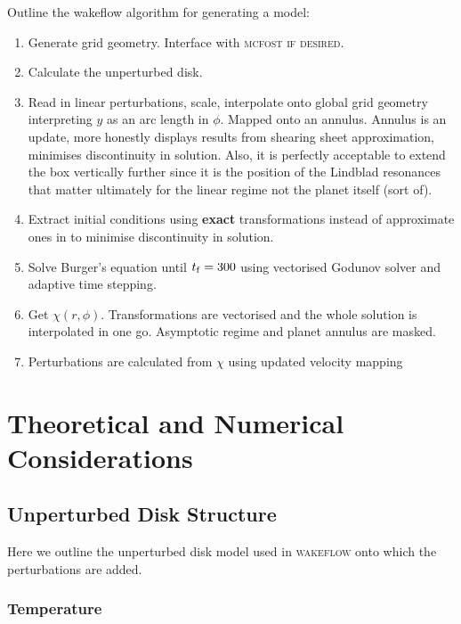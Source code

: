 Outline the wakeflow algorithm for generating a model:
\begin{enumerate}
    \item Generate grid geometry. Interface with \textsc{mcfost if desired}.
    \item Calculate the unperturbed disk.
    \item Read in linear perturbations, scale, interpolate onto global grid geometry interpreting $y$ as an arc length in $\phi$. Mapped onto an annulus. Annulus is an update, more honestly displays results from shearing sheet approximation, minimises discontinuity in solution. Also, it is perfectly acceptable to extend the box vertically further since it is the position of the Lindblad resonances that matter ultimately for the linear regime not the planet itself (sort of).
    \item Extract initial conditions using \textbf{exact} transformations instead of approximate ones in \citet{bollati2021} to minimise discontinuity in solution.
    \item Solve Burger's equation until $t_{\rm f}=300$ using vectorised Godunov solver and adaptive time stepping.
    \item Get $\chi(r,\phi)$. Transformations are vectorised and the whole solution is interpolated in one go. Asymptotic regime and planet annulus are masked.
    \item Perturbations are calculated from $\chi$ using updated velocity mapping
\end{enumerate}

\section{Theoretical and Numerical Considerations} 


\subsection{Unperturbed Disk Structure} \label{sec:diskstruct}

Here we outline the unperturbed disk model used in \textsc{wakeflow} onto which the perturbations are added.

\subsubsection{Temperature}

